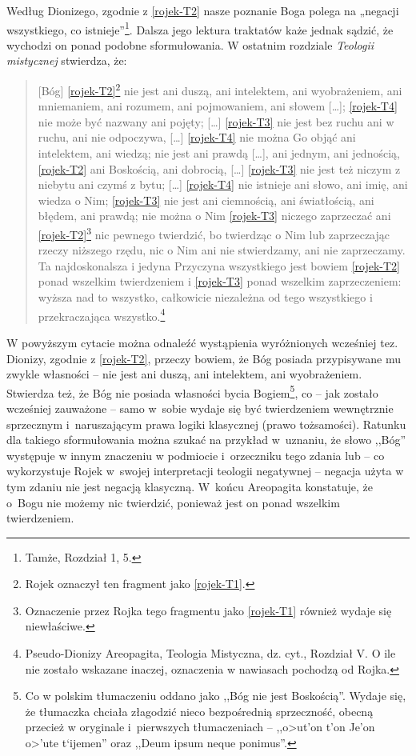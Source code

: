 Według Dionizego, zgodnie z \eqref{rojek-T2} nasze poznanie Boga polega na „negacji
wszystkiego, co istnieje”\footnote{Tamże, Rozdział 1, 5. }.
Dalsza jego lektura traktatów każe jednak sądzić, że wychodzi on ponad podobne sformułowania. W ostatnim
rozdziale \textit{Teologii mistycznej} stwierdza, że:

\begin{quote}
    [Bóg] \eqref{rojek-T2}\footnote{Rojek oznaczył ten fragment jako \eqref{rojek-T1}.} nie
jest ani duszą, ani intelektem, ani wyobrażeniem, ani mniemaniem, ani
rozumem, ani pojmowaniem, ani słowem […]; \eqref{rojek-T4} nie może być nazwany ani
pojęty; […] \eqref{rojek-T3} nie jest bez ruchu ani w ruchu, ani nie odpoczywa, […]
\eqref{rojek-T4} nie można Go objąć ani intelektem, ani wiedzą; nie jest ani prawdą
[…], ani jednym, ani jednością, \eqref{rojek-T2} ani Boskością, ani dobrocią, […]
\eqref{rojek-T3} nie jest też niczym z niebytu ani czymś z bytu; […] \eqref{rojek-T4} nie
istnieje ani słowo, ani imię, ani wiedza o Nim; \eqref{rojek-T3} nie jest ani
ciemnością, ani światłością, ani błędem, ani prawdą; nie można o Nim
\eqref{rojek-T3} niczego zaprzeczać ani \eqref{rojek-T2}\footnote{Oznaczenie przez Rojka tego fragmentu
jako \eqref{rojek-T1} również wydaje się niewłaściwe.} nic pewnego
twierdzić, bo twierdząc o Nim lub zaprzeczając rzeczy niższego rzędu,
nic o Nim ani nie stwierdzamy, ani nie zaprzeczamy. Ta najdoskonalsza i
jedyna Przyczyna wszystkiego jest bowiem \eqref{rojek-T2} ponad wszelkim
twierdzeniem i \eqref{rojek-T3} ponad wszelkim zaprzeczeniem: wyższa nad to
wszystko, całkowicie niezależna od tego wszystkiego i przekraczająca
wszystko.\footnote{Pseudo-Dionizy Areopagita, Teologia Mistyczna, dz.
cyt., Rozdział V. O ile nie zostało wskazane inaczej, oznaczenia w nawiasach pochodzą od Rojka.}
\end{quote}




W powyższym cytacie można odnaleźć wystąpienia wyróżnionych wcześniej
tez. Dionizy, zgodnie z \eqref{rojek-T2}, przeczy bowiem, że Bóg posiada
przypisywane mu zwykle własności -- nie jest ani duszą, ani intelektem,
ani wyobrażeniem. Stwierdza też, że Bóg nie posiada własności bycia
Bogiem\footnote{Co w polskim tłumaczeniu oddano jako ,,Bóg nie jest \guillemotleft  Boskością\guillemotright ''. Wydaje się, że tłumaczka chciała złagodzić nieco bezpośrednią sprzeczność, obecną przecież w oryginale i~pierwszych tłumaczeniach -- ,,\textgreek{o>ut'on t'on Je'on o>'ute t`ijemen}'' oraz ,,Deum ipsum neque ponimus''.}, co -- jak zostało wcześniej zauważone –
samo w~sobie wydaje się być twierdzeniem wewnętrznie sprzecznym i~naruszającym prawa logiki klasycznej (prawo tożsamości). Ratunku dla takiego
sformułowania można szukać na przykład w~uznaniu, że słowo ,,Bóg'' występuje w innym
znaczeniu w podmiocie i~orzeczniku tego zdania lub -- co 
wykorzystuje Rojek w~swojej interpretacji teologii negatywnej -- negacja użyta w tym zdaniu nie jest negacją
klasyczną. W~końcu Areopagita konstatuje, że o~Bogu nie możemy nic
twierdzić, ponieważ jest on ponad wszelkim twierdzeniem.

